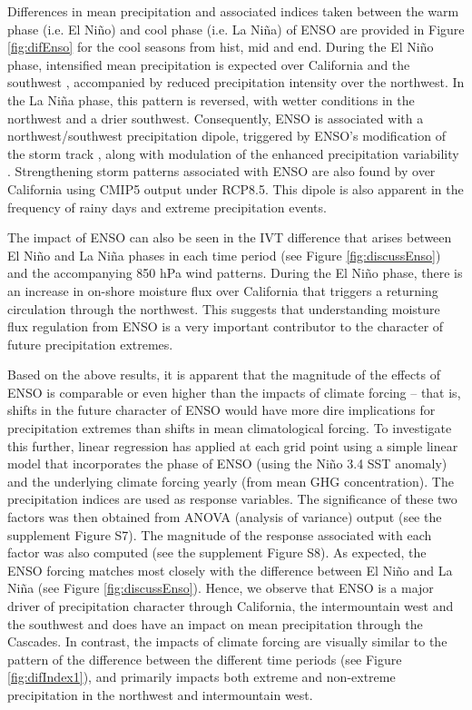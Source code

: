 \documentclass{ametsoc}
\begin{document}
Differences in mean precipitation and associated indices taken between the warm phase (i.e. El Ni\~no) and cool phase (i.e. La Ni\~na) of ENSO are provided in Figure \ref{fig:difEnso} for the cool seasons from \textsf{hist}, \textsf{mid} and \textsf{end}.  During the El Ni\~no phase, intensified mean precipitation is expected over California and the southwest \citep{hamlet2007effects}, accompanied by reduced precipitation intensity over the northwest. In the La Ni\~na phase, this pattern is reversed, with wetter conditions in the northwest and a drier southwest. Consequently, ENSO is associated with a northwest/southwest precipitation dipole, triggered by ENSO's modification of the storm track \citep{gershunov1998interdecadal, leung2003hydroclimate}, along with modulation of the enhanced precipitation variability \citep{cayan1999enso, kahya1994influences}. Strengthening storm patterns associated with ENSO are also found by \cite{maloney2014north} over California using CMIP5 output under RCP8.5.  This dipole is also apparent in the frequency of rainy days and extreme precipitation events. 


The impact of ENSO can also be seen in the IVT difference that arises between El Ni\~no and La Ni\~na phases in each time period (see Figure \ref{fig:discussEnso}) and the accompanying 850 hPa wind patterns.  During the El Ni\~no phase, there is an increase in on-shore moisture flux over California that triggers a returning circulation through the northwest.  This suggests that understanding moisture flux regulation from ENSO is a very important contributor to the character of future precipitation extremes.

Based on the above results, it is apparent that the magnitude of the effects of ENSO is comparable or even higher than the impacts of climate forcing -- that is, shifts in the future character of ENSO would have more dire implications for precipitation extremes than shifts in mean climatological forcing.  To investigate this further, linear regression has applied at each grid point using a simple linear model that incorporates the phase of ENSO (using the Ni\~no 3.4 SST anomaly) and the underlying climate forcing yearly (from mean GHG concentration).  The precipitation indices are used as response variables. The significance of these two factors was then obtained from ANOVA (analysis of variance) output (see the supplement Figure S7). The magnitude of the response associated with each factor was also computed (see the supplement Figure S8).  As expected, the ENSO forcing matches most closely with the difference between El Ni\~no and La Ni\~na (see Figure \ref{fig:discussEnso}).  Hence, we observe that ENSO is a major driver of precipitation character through California, the intermountain west and the southwest and does have an impact on mean precipitation through the Cascades. In contrast, the impacts of climate forcing are visually similar to the pattern of the difference between the different time periods (see Figure \ref{fig:difIndex1}), and primarily impacts both extreme and non-extreme precipitation in the northwest and intermountain west.
\end{document}
